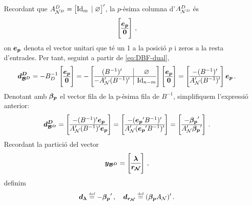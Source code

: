 Recordant que $A^D_{\mathcal{N}^D} = \left[\operatorname{Id}_{m} \;|\; \varnothing \right]'$, la $p$-èsima columna d'$A^D_{\mathcal{N}^D}$ és
\[
	\left[
	\begin{array}{@{}c@{}}
		\vb{e_p}\\
		\hline
		\vb{0}
	\end{array}
	\right]\,,
\]
on $\boldsymbol{e_p}$ denota el vector unitari que té un 1 a la posició $p$ i zeros a la resta d'entrades. Per tant, seguint a partir de \eqref{eq:DBF-dual},
\[
	\vb{d^D_{\B^D}} = -B^{-1}_D
	\left[
	\begin{array}{@{}c@{}}
		\vb{e_p}\\
		\hline
		\vb{0}
	\end{array}
	\right]
	= 
	- \left[
	\begin{array}{@{}c|c@{}}
		(B^{-1})'	  &	\varnothing	\\
		\hline
		-A_\N'(B^{-1})' & \Id_{n-m}
	\end{array}
	\right]
	\left[
	\begin{array}{@{}c@{}}
		\vb{e_p}\\
		\hline
		\vb{0}
		\end{array}
	\right]
	=
	\left[
	\begin{array}{@{}c@{}}
		-(B^{-1})'\\
		\hline
		A_\N'(B^{-1})'
	\end{array}
	\right]
	\vb{e_p}\,.
\]
Denotant amb $\boldsymbol{\beta_p}$ el vector fila de la p-èsima fila de $B^{-1}$, simplifiquem l'expressió anterior:
\[
	\vb{d^D_{\B^D}} =
	\left[
	\begin{array}{@{}c@{}}
		-(B^{-1})'\vb{e_p}\\
		\hline
		A_\N'(B^{-1})'\vb{e_p}
	\end{array}
	\right]
	=
	\left[
	\begin{array}{@{}c@{}}
		-(\vb{e_p}'B^{-1})'\\
		\hline
		A_\N'(\vb{e_p}'B^{-1})'
	\end{array}
	\right]
	=
	\left[
	\begin{array}{@{}c@{}}
		-\vb{\beta_p}'\\
		\hline
		A_\N'\vb{\beta_p}'
	\end{array}
	\right]\,.
\]
Recordant la partició del vector 
\[
	\vb{y_{\B^D}} =
	\left[
	\begin{array}{@{}c@{}}
		\vb{\lambda}\\
		\hline
		\vb{r_\N}
	\end{array}
	\right]\,,
\]
definim
\[
 \boldsymbol{d_\lambda} \stackrel{\text{\tiny def}}{=} -\boldsymbol{\beta_p}'\,, \quad \boldsymbol{d_{r_{\mathcal{N}}}} \stackrel{\text{\tiny def}}{=} (\boldsymbol{\beta_p} A_{\mathcal{N}})'\,.
\]

